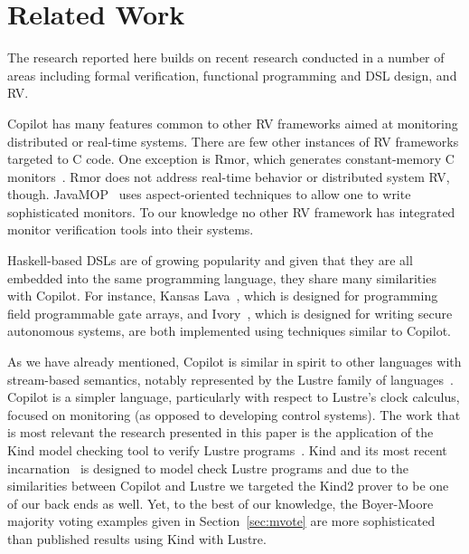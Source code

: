 \section{Related Work}\label{sec:related}
The research reported here builds on recent  research conducted in a number
of areas including formal verification, functional programming and
DSL design, and RV. 

Copilot has many features common to other RV frameworks aimed at
 monitoring distributed or real-time systems.  
There are few other instances of RV frameworks targeted to C code.  One exception is {\sc
 Rmor}, which generates constant-memory C monitors~\cite{havelundc}.  {\sc
  Rmor} does not address real-time behavior or distributed system RV,
though.    JavaMOP~\cite{javamop}  uses aspect-oriented techniques
to allow one to write sophisticated monitors. To our knowledge no
other RV framework has integrated monitor verification tools into
their systems. 


Haskell-based DSLs are of growing popularity and given that they are all
embedded into the same programming language, they share many
similarities with Copilot. For instance, 
 Kansas Lava~\cite{Gill:14:DSLs}, which is designed for
programming  field programmable gate arrays,  and 
Ivory~\cite{pike-plpv14}, which is designed for writing secure autonomous
systems, are both implemented using techniques similar to Copilot.  




As we have already mentioned, Copilot is similar in spirit to other
languages with stream-based semantics, notably represented by the
Lustre family of languages~\cite{lustre-intro}.  Copilot is a simpler
language, particularly with respect to Lustre's clock calculus,
focused on monitoring (as opposed to developing control systems).
The work that is most
relevant the research presented in this paper is the application of
the Kind model checking tool to verify Lustre programs~\cite{Hagen08}.
Kind and its most recent incarnation~\cite{kind} is designed to model
check Lustre programs and due to the similarities between Copilot and
Lustre we targeted the Kind2 prover to be one of our back ends as
well.  Yet, to the best of our knowledge, the Boyer-Moore majority
voting examples given in Section~\ref{sec:mvote} are more
sophisticated than published results using Kind with Lustre.
  


